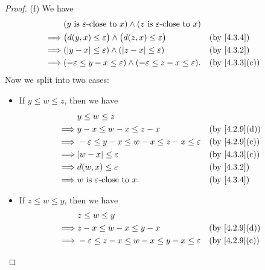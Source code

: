 \begin{proof}{(f)}
	We have
	\begin{align*}
		         & (y \text{ is } \varepsilon\text{-close to } x) \land (z \text{ is } \varepsilon\text{-close to } x)                                  \\
		\implies & \big(d(y, x) \leq \varepsilon\big) \land \big(d(z, x) \leq \varepsilon\big)                         &  & \by{4.3.4}                  \\
		\implies & (\abs{y - x} \leq \varepsilon) \land (\abs{z - x} \leq \varepsilon)                                 &  & \by{4.3.2}                  \\
		\implies & (-\varepsilon \leq y - x \leq \varepsilon) \land (-\varepsilon \leq z - x \leq \varepsilon).        &  & \text{(by \cref{4.3.3}(c))}
	\end{align*}
	Now we split into two cases:
	\begin{itemize}
		\item If \(y \leq w \leq z\), then we have
		      \begin{align*}
			               & y \leq w \leq z                                                                                 \\
			      \implies & y - x \leq w - x \leq z - x                                    &  & \text{(by \cref{4.2.9}(d))} \\
			      \implies & -\varepsilon \leq y - x \leq w - x \leq z - x \leq \varepsilon &  & \text{(by \cref{4.2.9}(c))} \\
			      \implies & \abs{w - x} \leq \varepsilon                                   &  & \text{(by \cref{4.3.3}(c))} \\
			      \implies & d(w, x) \leq \varepsilon                                       &  & \by{4.3.2}                  \\
			      \implies & w \text{ is } \varepsilon\text{-close to } x.                  &  & \by{4.3.4}
		      \end{align*}
		\item If \(z \leq w \leq y\), then we have
		      \begin{align*}
			               & z \leq w \leq y                                                                                 \\
			      \implies & z - x \leq w - x \leq y - x                                    &  & \text{(by \cref{4.2.9}(d))} \\
			      \implies & -\varepsilon \leq z - x \leq w - x \leq y - x \leq \varepsilon &  & \text{(by \cref{4.2.9}(c))} \\

\end{align*}
\end{itemize}
\end{proof}
